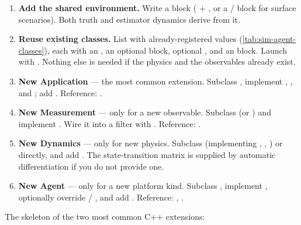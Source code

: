 \begin{enumerate}[leftmargin=*]
  \item \textbf{Add the shared environment.} Write a  block
    ( $+$ , or a  / 
    block for surface scenarios). Both truth and estimator dynamics derive from
    it.
  \item \textbf{Reuse existing classes.} List  with
    already-registered  values
    (\cref{tab:sim-agent-classes}), each with an , an
    optional  block, optional , and an
     block. Launch with . Nothing
    else is needed if the physics and the observables already exist.
  \item \textbf{New Application} --- the most common extension. Subclass
    , implement , , and
    ; add .
    Reference: .
  \item \textbf{New Measurement} --- only for a new observable. Subclass
     (or ) and implement
    . Wire it into a filter with
    . Reference:
    .
  \item \textbf{New Dynamics} --- only for new physics. Subclass
     (implementing , ,
    ) or  directly, and add
    . The state-transition matrix is
    supplied by automatic differentiation if you do not provide one.
  \item \textbf{New Agent} --- only for a new platform kind. Subclass
    , implement , optionally override
     / , and add
    . Reference:
    , .
\end{enumerate}

The skeleton of the two most common C++ extensions:

